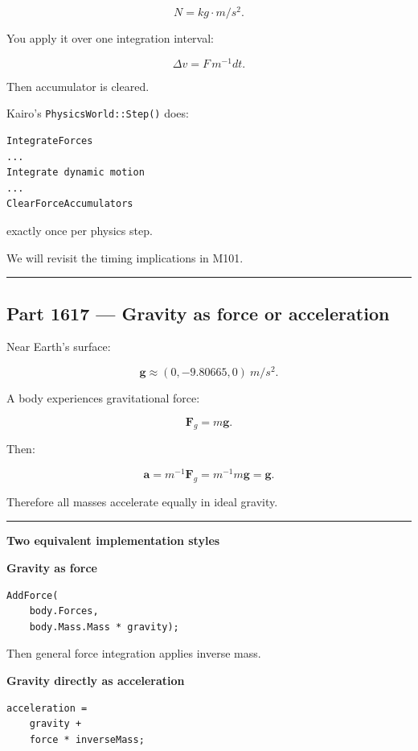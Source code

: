 \[
N=kg\cdot m/s^2.
\]

You apply it over one integration interval:

\[
\Delta v=
F\,m^{-1}dt.
\]

Then accumulator is cleared.

Kairo's \texttt{PhysicsWorld::Step()} does:

\begin{verbatim}
IntegrateForces
...
Integrate dynamic motion
...
ClearForceAccumulators
\end{verbatim}

exactly once per physics step.

We will revisit the timing implications in M101.

\begin{center}\rule{0.5\linewidth}{0.5pt}\end{center}

\subsection{Part 1617 --- Gravity as force or acceleration}\label{06-engine-ii-ch034-part-1617-gravity-as-force-or-acceleration}

Near Earth's surface:

\[
\mathbf{g}
\approx
(0,-9.80665,0)
\ m/s^2.
\]

A body experiences gravitational force:

\[
\boxed{
\mathbf{F}_g
=
m\mathbf{g}.
}
\]

Then:

\[
\mathbf{a}
=
m^{-1}\mathbf{F}_g
=
m^{-1}m\mathbf{g}
=
\mathbf{g}.
\]

Therefore all masses accelerate equally in ideal gravity.

\begin{center}\rule{0.5\linewidth}{0.5pt}\end{center}

\textbf{Two equivalent implementation styles}

\textbf{Gravity as force}

\begin{verbatim}
AddForce(
    body.Forces,
    body.Mass.Mass * gravity);
\end{verbatim}

Then general force integration applies inverse mass.

\textbf{Gravity directly as acceleration}

\begin{verbatim}
acceleration =
    gravity +
    force * inverseMass;
\end{verbatim}

